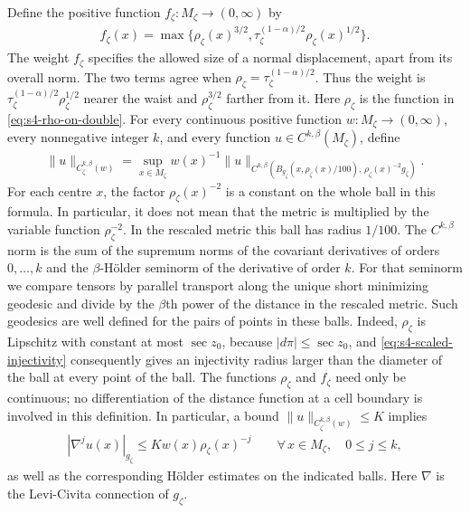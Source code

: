 \documentclass[a4paper,11pt,oneside,reqno]{amsart}
\numberwithin{equation}{section}
\theoremstyle{definition}
\begin{document}
Define the positive function $f_\zeta:M_\zeta\to(0,\infty)$ by
%
\begin{align}
    \label{eq:s4-weight}
    f_\zeta(x)=\max\{\rho_\zeta(x)^{3/2},
    \tau_\zeta^{(1-\alpha)/2}\rho_\zeta(x)^{1/2}\}.
\end{align}
%
The weight $f_\zeta$ specifies the allowed size of a normal
displacement, apart from its overall norm. The two terms agree when
$\rho_\zeta=\tau_\zeta^{(1-\alpha)/2}$. Thus the weight is
$\tau_\zeta^{(1-\alpha)/2}\rho_\zeta^{1/2}$ nearer the
waist and $\rho_\zeta^{3/2}$ farther from it.
Here $\rho_\zeta$ is the function in
\eqref{eq:s4-rho-on-double}. For every continuous positive
function $w:M_\zeta\to(0,\infty)$,
every nonnegative integer $k$, and every function
$u\in C^{k,\beta}(M_\zeta)$, define
%
\begin{align}
    \label{eq:s4-weighted-norm}
    \|u\|_{C^{k,\beta}_\zeta(w)}
    =\sup_{x\in M_\zeta}w(x)^{-1}
    \|u\|_{C^{k,\beta}
    (B_{g_\zeta}(x,\rho_\zeta(x)/100),\,
    \rho_\zeta(x)^{-2}g_\zeta)}.
\end{align}
%
For each centre $x$, the factor $\rho_\zeta(x)^{-2}$ is a
constant on the whole ball in this formula. In particular, it
does not mean that the metric is multiplied by the variable
function $\rho_\zeta^{-2}$. In the rescaled metric this ball
has radius $1/100$.
The $C^{k,\beta}$ norm is the sum of the supremum norms of
the covariant derivatives of orders $0,\ldots,k$ and the
$\beta$-H\"older seminorm of the derivative of order $k$.
For that seminorm we compare tensors by parallel transport
along the unique short minimizing geodesic and divide by the
$\beta$th power of the distance in the rescaled metric.
Such geodesics are well defined for the pairs of points in
these balls. Indeed, $\rho_\zeta$ is Lipschitz with constant
at most $\sec z_0$, because $|d\pi|\leq\sec z_0$, and
\eqref{eq:s4-scaled-injectivity} consequently gives an
injectivity radius larger than the diameter of the ball at
every point of the ball.
The functions $\rho_\zeta$ and $f_\zeta$ need only be continuous;
no differentiation of the distance function at a cell boundary
is involved in this definition.
In particular, a bound $\|u\|_{C^{k,\beta}_\zeta(w)}\leq K$
implies
%
\begin{align*}
    |\nabla^j u(x)|_{g_\zeta}
    \leq K w(x)\rho_\zeta(x)^{-j}
    \qquad\forall\,x\in M_\zeta,\quad 0\leq j\leq k,
\end{align*}
%
as well as the corresponding H\"older estimates on the indicated
balls. Here $\nabla$ is the Levi-Civita connection of $g_\zeta$.
\end{document}
